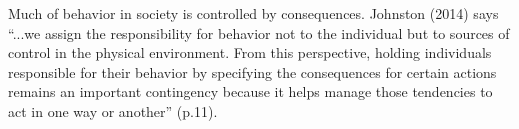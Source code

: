 Much of behavior in society is controlled by consequences. Johnston (2014) says ``...we assign the responsibility for behavior not to the individual but to sources of control in the physical environment. From this perspective, holding individuals responsible for their behavior by specifying the consequences for certain actions remains an important contingency because it helps manage those tendencies to act in one way or another'' (p.11).
%